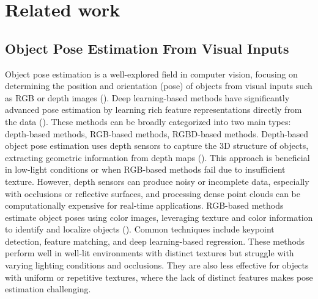 \section{Related work}
\label{sec:relatedwork}

\subsection{Object Pose Estimation From Visual Inputs}

Object pose estimation is a well-explored field in computer vision, focusing on determining the position and orientation (pose) of objects from visual inputs such as RGB or depth images (\cite{wang2019densefusion, he2020pvn3d, he2021ffb6d}). Deep learning-based methods have significantly advanced pose estimation by learning rich feature representations directly from the data (\cite{wang2021gdr, peng2019pvnet}). These methods can be broadly categorized into two main types: depth-based methods, RGB-based methods, RGBD-based methods. Depth-based object pose estimation uses depth sensors to capture the 3D structure of objects, extracting geometric information from depth maps (\cite{wang20216d, gao20206d, guo2021efficient}). This approach is beneficial in low-light conditions or when RGB-based methods fail due to insufficient texture. However, depth sensors can produce noisy or incomplete data, especially with occlusions or reflective surfaces, and processing dense point clouds can be computationally expensive for real-time applications. RGB-based methods estimate object poses using color images, leveraging texture and color information to identify and localize objects (\cite{billings2019silhonet, peng2019pvnet, wang2021gdr}). Common techniques include keypoint detection, feature matching, and deep learning-based regression. These methods perform well in well-lit environments with distinct textures but struggle with varying lighting conditions and occlusions. They are also less effective for objects with uniform or repetitive textures, where the lack of distinct features makes pose estimation challenging. 

